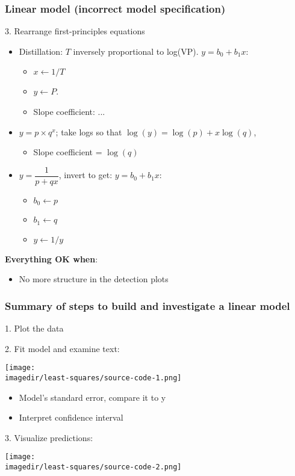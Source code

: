 \begin{frame}\frametitle{Linear model (incorrect model specification)}
	
	3. Rearrange first-principles equations 
	\begin{itemize}
		\item	Distillation: $T$ inversely proportional to log(VP). $y = b_0 + b_1x$: 
		\begin{itemize}
			\item	$x \leftarrow 1/T$ 
			\item	$y \leftarrow P$. 
			\item	Slope coefficient: ... 
		\end{itemize}
		\item	$y = p \times q^x$; take logs so that $\log(y) = \log(p) + x \log(q)$, 
		\begin{itemize}
			\item	Slope coefficient = $\log(q)$ 
		\end{itemize}
		\item	$y = \dfrac{1}{p+qx}$, invert to get: $y = b_0 + b_1 x$: 
		\begin{itemize}
			\item	$b_0 \leftarrow p$ 
			\item	$b_1 \leftarrow q$ 
			\item	$y\leftarrow 1/y$ 
		\end{itemize}
	\end{itemize}
	
	\textbf{Everything OK when}: 
	\begin{itemize}
		\item	No more structure in the detection plots 
	\end{itemize}
\end{frame}

\begin{frame}\frametitle{Summary of steps to build and investigate a linear model}
	
	1. Plot the data
	
	2. Fit model and examine text:
	\begin{center}
		\texttt{[image: \\imagedir/least-squares/source-code-1.png]} 
	\end{center}
	\begin{itemize}
		\item	Model's standard error, compare it to y 
		\item	Interpret confidence interval 
	\end{itemize}
	
	3. Visualize predictions:
	\begin{center}
		\texttt{[image: \\imagedir/least-squares/source-code-2.png]}
	\end{center}
\end{frame}


